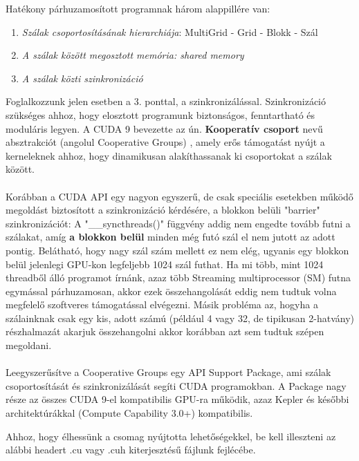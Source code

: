 Hatékony párhuzamosított programnak három alappillére van: \cite{kvantum_optim}
\begin{enumerate}
	\item \emph{Szálak csoportosításának hierarchiája}: MultiGrid - Grid - Blokk - Szál
	\item \emph{A szálak között megosztott memória: shared memory}
	\item \emph{A szálak közti szinkronizáció}
\end{enumerate}
Foglalkozzunk jelen esetben a 3. ponttal, a szinkronizálással. Szinkronizáció szükséges ahhoz, hogy elosztott programunk biztonságos, fenntartható és moduláris legyen. A CUDA 9 bevezette az ún. \textbf{Kooperatív csoport} nevű absztrakciót (angolul Cooperative Groups) \cite{CUDAdoc_coopGroups}, amely erős támogatást nyújt a kerneleknek ahhoz, hogy dinamikusan alakíthassanak ki csoportokat a szálak között.

\paragraph{}
Korábban a CUDA API egy nagyon egyszerű, de csak speciális esetekben működő megoldást biztosított a szinkronizáció kérdésére, a blokkon belüli "barrier" szinkronizációt: A "\_\_syncthreads()" függvény addig nem engedte tovább futni a szálakat, amíg \textbf{a blokkon belül} minden még futó szál el nem jutott az adott pontig. Belátható, hogy nagy szál szám mellett ez nem elég, ugyanis egy blokkon belül jelenlegi GPU-kon legfeljebb 1024 szál futhat. Ha mi több, mint 1024 threadből álló programot írnánk, azaz több Streaming multiprocessor (SM) futna egymással párhuzamosan, akkor ezek összehangolását eddig nem tudtuk volna megfelelő szoftveres támogatással elvégezni. Másik probléma az, hogyha a szálainknak csak egy kis, adott számú (például 4 vagy 32, de tipikusan 2-hatvány) részhalmazát akarjuk összehangolni akkor korábban azt sem tudtuk szépen megoldani.

\paragraph{}
Leegyszerűsítve a Cooperative Groups egy API Support Package, ami szálak csoportosítását és szinkronizálását segíti CUDA programokban. A Package nagy része az összes CUDA 9-el kompatibilis GPU-ra működik, azaz Kepler és későbbi architektúrákkal (Compute Capability 3.0+) kompatibilis.

Ahhoz, hogy élhessünk a csomag nyújtotta lehetőségekkel, be kell illeszteni az alábbi headert .cu vagy .cuh kiterjesztésű fájlunk fejlécébe.

